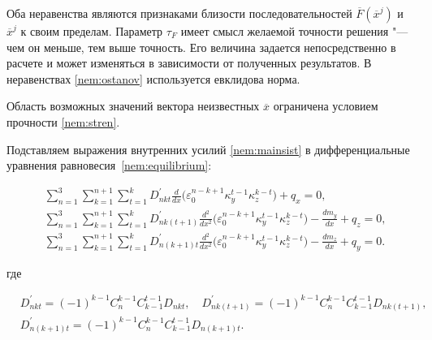 Оба неравенства являются признаками близости последовательностей $\overline{F}\left(\overline{x}^j\right)$ и $\overline{x}^j$ к своим пределам. Параметр $\tau_F$ имеет смысл желаемой точности решения "---  чем он меньше, тем выше точность. Его величина задается непосредственно в расчете и может изменяться в зависимости от полученных результатов. В неравенствах \eqref{nem:ostanov} используется евклидова норма.



Область возможных значений вектора неизвестных $\overline{x}$ ограничена условием прочности \eqref{nem:stren}.




Подставляем выражения внутренних усилий \eqref{nem:mainsist} в дифференциальные уравнения равновесия~\eqref{nem:equilibrium}:



\begin{equation}\label{nem:eq21}

\begin{aligned}

&\sum_{n=1}^3\sum_{k=1}^{n+1}\sum_{t=1}^k 

D_{nkt}^\prime 

\frac{d}{dx}\bigl(\varepsilon_0^{n-k+1}\kappa_y^{t-1}\kappa_z^{k-t}\bigr)+q_x=0,\\

&\sum_{n=1}^3\sum_{k=1}^{n+1}\sum_{t=1}^k 

D_{nk(t+1)}^\prime\frac{d^2}{dx^2}\bigl(\varepsilon_0^{n-k+1}\kappa_y^{t-1}\kappa_z^{k-t}\bigr)-\frac{dm_y}{dx}+q_z=0,\\

&\sum_{n=1}^3\sum_{k=1}^{n+1}\sum_{t=1}^k 

D_{n(k+1)t}^\prime\frac{d^2}{dx^2}\bigl(\varepsilon_0^{n-k+1}\kappa_y^{t-1}\kappa_z^{k-t}\bigr)-\frac{dm_z}{dx}+q_y=0.

\end{aligned}

\end{equation}

где

\begin{equation}

\begin{aligned}

&D_{nkt}^\prime=(-1)^{k-1}C_n^{k-1}C_{k-1}^{t-1}D_{nkt}, \quad

D_{nk\left(t+1\right)}^\prime=(-1)^{k-1}C_n^{k-1}C_{k-1}^{t-1}D_{nk\left(t+1\right)}, \\

&D_{n\left(k+1\right)t}^\prime=(-1)^{k-1}C_n^{k-1}C_{k-1}^{t-1}D_{n\left(k+1\right)t}.

\end{aligned}

\end{equation}



